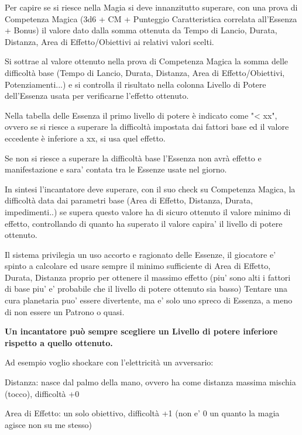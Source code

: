 \documentclass[a4paper,11pt,twoside,openany]{book}
\begin{document}
\label{riuscire-e-fallire-nella-prova-di-magia}

Per capire se si riesce nella Magia si deve innanzitutto superare, con una prova di Competenza Magica (3d6 + CM + Punteggio Caratteristica correlata all'Essenza + Bonus) il valore dato dalla somma ottenuta da Tempo di Lancio, Durata, Distanza, Area di Effetto/Obiettivi ai relativi valori scelti.

Si sottrae al valore ottenuto nella prova di Competenza Magica la somma delle difficoltà base (Tempo di Lancio, Durata, Distanza, Area di Effetto/Obiettivi, Potenziamenti...) e si controlla il risultato nella colonna Livello di Potere dell'Essenza usata per verificarne l'effetto ottenuto.

Nella tabella delle Essenza il primo livello di potere è indicato come "< xx", ovvero se si riesce a superare la difficoltà impostata dai fattori base ed il valore eccedente è inferiore a xx, si usa quel effetto.

Se non si riesce a superare la difficoltà base l'Essenza non avrà effetto e manifestazione e sara' contata tra le Essenze usate nel giorno.

In sintesi l'incantatore deve superare, con il suo check su Competenza Magica, la difficoltà data dai parametri base (Area di Effetto, Distanza, Durata, impedimenti..) se supera questo valore ha di sicuro ottenuto il valore minimo di effetto, controllando di quanto ha superato il valore capira' il livello di potere ottenuto.

Il sistema privilegia un uso accorto e ragionato delle Essenze, il giocatore e' spinto a calcolare ed usare sempre il minimo sufficiente di Area di Effetto, Durata, Distanza proprio per ottenere il massimo effetto (piu' sono alti i fattori di base piu' e' probabile che il livello di potere ottenuto sia basso)
Tentare una cura planetaria puo' essere divertente, ma e' solo uno spreco di Essenza, a meno di non essere un Patrono o quasi.

\bigskip

\textbf{Un incantatore può sempre scegliere un Livello di potere inferiore rispetto a quello ottenuto.}

Ad esempio voglio shockare con l'elettricità un avversario:

Distanza: nasce dal palmo della mano, ovvero ha come distanza massima mischia (tocco), difficoltà +0

Area di Effetto: un solo obiettivo, difficoltà +1 (non e' 0 un quanto la magia agisce non su me stesso)
\end{document}
